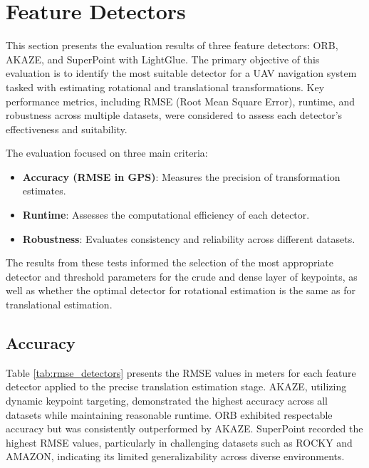 \section{Feature Detectors}

This section presents the evaluation results of three feature detectors: ORB, AKAZE, and SuperPoint with LightGlue. The primary objective of this evaluation is to identify the most suitable detector for a UAV navigation system tasked with estimating rotational and translational transformations. Key performance metrics, including RMSE (Root Mean Square Error), runtime, and robustness across multiple datasets, were considered to assess each detector's effectiveness and suitability.


The evaluation focused on three main criteria:
\begin{itemize}
    \item \textbf{Accuracy (RMSE in GPS)}: Measures the precision of transformation estimates.
    \item \textbf{Runtime}: Assesses the computational efficiency of each detector.
    \item \textbf{Robustness}: Evaluates consistency and reliability across different datasets.
\end{itemize}

The results from these tests informed the selection of the most appropriate detector and threshold parameters for the crude and dense layer of keypoints, as well as whether the optimal detector for rotational estimation is the same as for translational estimation. 

\subsection{Accuracy}

Table \ref{tab:rmse_detectors} presents the RMSE values in meters for each feature detector applied to the precise translation estimation stage. AKAZE, utilizing dynamic keypoint targeting, demonstrated the highest accuracy across all datasets while maintaining reasonable runtime. ORB exhibited respectable accuracy but was consistently outperformed by AKAZE. SuperPoint recorded the highest RMSE values, particularly in challenging datasets such as ROCKY and AMAZON, indicating its limited generalizability across diverse environments.

